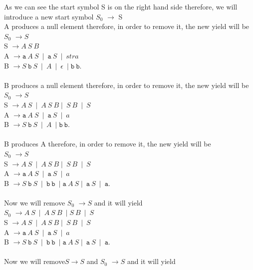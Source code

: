 \documentclass[a4page]{exam}
\newcommand{\Str}[1]{\mathtt{#1}}
\begin{document}
\begin{questions}
As we can see the start symbol S is on the right hand side therefore, we will introduce a new start symbol $S_{0}$ $\rightarrow$ S\\
A produces a null element therefore, in order to remove it, the new yield will be\\
$S_{0}$ $\rightarrow S$\\
S $\rightarrow A\ S\ B $\\
    A $\rightarrow \Str{a}\ A\ S\ \mid\  \Str{a}\ S \ \mid\ str{a}$ \\
    B $\rightarrow S\ \Str{b}\ S\ \mid\ A\ \mid\ \epsilon \ \mid \Str{b} \ \Str{b}$.\\
\\
B produces a null element therefore, in order to remove it, the new yield will be\\
$S_{0}$ $\rightarrow S$\\
S $\rightarrow A\ S\ \mid \ A \ S \ B \mid \ S \ B \ \mid \ S  $\\
    A $\rightarrow \Str{a}\ A\ S\ \mid\  \Str{a}\ S \ \mid\ a$ \\
    B $\rightarrow S\ \Str{b}\ S\ \mid\ A\ \mid \Str{b} \ \Str{b}$.\\
\\
B produces A therefore, in order to remove it, the new yield will be\\
$S_{0}$ $\rightarrow S$\\
S $\rightarrow A\ S\ \mid \ A \ S \ B \mid \ S \ B \ \mid \ S  $\\
    A $\rightarrow \Str{a}\ A\ S\ \mid\  \Str{a}\ S \ \mid\ a$ \\
    B $\rightarrow S\ \Str{b}\ S\ \mid\ \Str{b} \ \Str{b}\ \mid \Str{a} \ A \ S \mid \ \Str{a} \ S \ \mid \ \Str{a}$.\\
\\
Now we will remove $S_{0}$ $\rightarrow S$ and it will yield\\
$S_{0}$ $\rightarrow A \ S \ \mid \ A \ S \ B \ \mid S \ B \ \mid \ S$\\
S $\rightarrow A\ S\ \mid \ A \ S \ B \mid \ S \ B \ \mid \ S  $\\
    A $\rightarrow \Str{a}\ A\ S\ \mid\  \Str{a}\ S \ \mid\ a$ \\
    B $\rightarrow S\ \Str{b}\ S\ \mid\ \Str{b} \ \Str{b}\ \mid \Str{a} \ A \ S \mid \ \Str{a} \ S \ \mid \ \Str{a}$.\\
\\
Now we will remove$S \rightarrow S$ and $S_{0}$ $\rightarrow S$ and it will yield\\

\end{questions}
\end{document}
